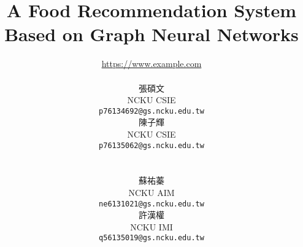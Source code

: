 \documentclass[10pt,twocolumn,letterpaper]{article}
\title{A Food Recommendation System Based on Graph Neural Networks}
\author{
\url{https://www.example.com}\\
\begin{minipage}{0.45\textwidth}
\centering
張碩文\\
NCKU CSIE\\
{\tt\small p76134692@gs.ncku.edu.tw}
\end{minipage}
\hfill
\begin{minipage}{0.45\textwidth}
\centering
陳子輝\\
NCKU CSIE\\
{\tt\small p76135062@gs.ncku.edu.tw}
\end{minipage}
\\[1.5cm] %
\begin{minipage}{0.45\textwidth}
\centering
蘇祐蓁\\
NCKU AIM\\
{\tt\small ne6131021@gs.ncku.edu.tw}
\end{minipage}
\hfill
\begin{minipage}{0.45\textwidth}
\centering
許漢權\\
NCKU IMI\\
{\tt\small q56135019@gs.ncku.edu.tw}
\end{minipage}
}
\begin{document}
\begin{CJK}{UTF8}{bkai}  %

\maketitle

    




{
    \small
    
    
}

\end{CJK}  %
\end{document}
